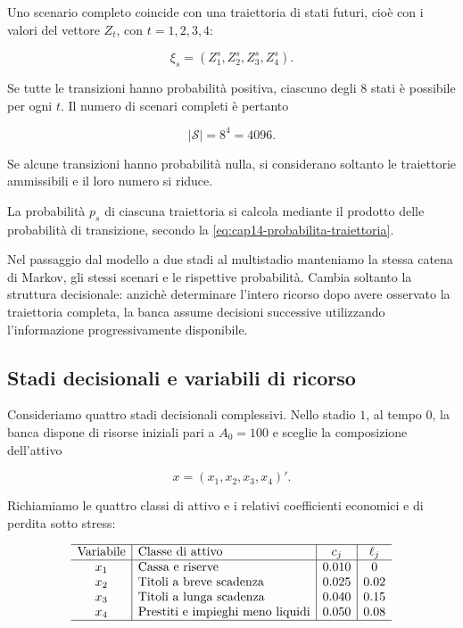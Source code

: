 Uno scenario completo coincide con una traiettoria
di stati futuri, cioè con i valori del vettore $Z_t$, con $t=1,2,3,4$:

\[
\xi_s=(Z_1^s,Z_2^s,Z_3^s,Z_4^s).
\]

Se tutte le transizioni hanno probabilit\`a
positiva, ciascuno degli 8 stati è possibile per ogni $t$. Il numero
di scenari completi \`e pertanto

\[
|\mathcal S|=8^4=4096.
\]

Se alcune transizioni hanno probabilit\`a
nulla, si considerano soltanto le traiettorie
ammissibili e il loro numero si riduce.

La probabilit\`a $p_s$ di ciascuna traiettoria
si calcola mediante il prodotto delle
probabilit\`a di transizione, secondo
la \eqref{eq:cap14-probabilita-traiettoria}.

Nel passaggio dal modello a due stadi
al multistadio manteniamo la stessa
catena di Markov, gli stessi scenari
e le rispettive probabilit\`a.
Cambia soltanto la struttura decisionale:
anzich\`e determinare l'intero ricorso
dopo avere osservato la traiettoria completa,
la banca assume decisioni successive
utilizzando l'informazione progressivamente
disponibile.

\subsection{Stadi decisionali e variabili di ricorso}

Consideriamo quattro stadi decisionali
complessivi. Nello stadio $1$, al tempo $0$, la banca dispone di risorse
iniziali pari a $A_0=100$ e sceglie la composizione dell'attivo

\[
x=(x_1,x_2,x_3,x_4)'.
\]

Richiamiamo le quattro classi di attivo e i relativi
coefficienti economici e di perdita sotto stress:

\[
\begin{array}{c|l|c|c}
\hline
\text{Variabile} & \text{Classe di attivo}
& c_j & \ell_j\\
\hline
x_1 & \text{Cassa e riserve}                  & 0.010 & 0\\
x_2 & \text{Titoli a breve scadenza}          & 0.025 & 0.02\\
x_3 & \text{Titoli a lunga scadenza}          & 0.040 & 0.15\\
x_4 & \text{Prestiti e impieghi meno liquidi} & 0.050 & 0.08\\
\hline
\end{array}
\]

